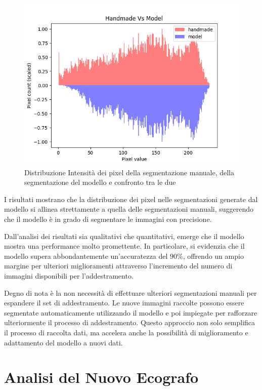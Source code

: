 \begin{figure}[!ht]
\begin{minipage}{0.32\textwidth}
		\includegraphics[width=\columnwidth]{Immagini/handmade_vs_model_scaled.png}
	\end{minipage}
	\caption{Distribuzione Intensità dei pixel della segmentazione manuale, della segmentazione del modello e confronto tra le due}
	\label{fig:distribuzione intensità dei pixel della segmentazione manuale, della segmentazione del modello e confronto tra le due}
\end{figure}


I risultati mostrano che la distribuzione dei pixel nelle segmentazioni generate dal modello si
allinea strettamente a quella delle segmentazioni manuali, suggerendo che il modello è in grado di
segmentare le immagini con precisione.


Dall'analisi dei risultati sia qualitativi che quantitativi, emerge che il modello mostra una
performance molto promettente. In particolare, si evidenzia che il modello supera abbondantemente
un'accuratezza del $90\%$, offrendo un ampio margine per ulteriori miglioramenti attraverso
l'incremento del numero di immagini disponibili per l'addestramento.

Degno di nota è la non necessità di effettuare ulteriori segmentazioni manuali per espandere il set
di addestramento. Le nuove immagini raccolte possono essere segmentate automaticamente utilizzando il
modello e poi impiegate per rafforzare ulteriormente il processo di addestramento. Questo approccio
non solo semplifica il processo di raccolta dati, ma accelera anche la possibilità di miglioramento
e adattamento del modello a nuovi dati.


\section{Analisi del Nuovo Ecografo}
\label{sec:analisi_nuovo_ecografo}

